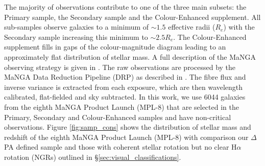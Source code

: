 \documentclass[fleqn,usenatbib]{mnras}
\begin{document}
The majority of observations contribute to one of the three main subsets: the Primary sample, the Secondary sample and the Colour-Enhanced supplement. All sub-samples observe galaxies to a minimum of $\sim 1.5$ effective radii ($R_{e}$) with the Secondary sample increasing this minimum to $\sim 2.5 R_{e}$. The Colour-Enhanced supplement fills in gaps of the colour-magnitude diagram leading to an approximately flat distribution of stellar mass. A full description of the MaNGA observing strategy is given in \citet{law2015obs,yan2016obs}. 
The raw observations are processed by the MaNGA Data 
Reduction Pipeline (DRP) as described in \citet{law2016drp, yan2016spec}. The fibre flux and inverse variance is extracted from each exposure, which are then wavelength calibrated, flat-fielded and sky subtracted. In this work, we use 6044 galaxies from the eighth MaNGA Product Launch (MPL-8) that are selected in the Primary, Secondary and Colour-Enhanced samples and have non-critical observations. Figure \ref{fig:samp_cons} shows the distribution of stellar mass and redshift of the eighth MaNGA Product Launch (MPL-8) with comparison our $\Delta$PA defined sample and those with coherent stellar rotation but no clear H$\alpha$ rotation (NGRs) outlined in \S\ref{sec:visual_classifications}.
\end{document}
